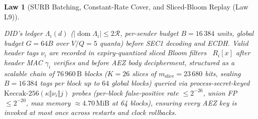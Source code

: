 \documentclass[journal]{IEEEtran}
\newtheorem{law}{Law}
\begin{document}
\begin{law}[SURB Batching, Constant-Rate Cover, and Sliced-Bloom Replay (Law L9)]
\begin{enumerate}[leftmargin=1.5em]
DID's ledger $\Lambda_i(d)$ ($|\operatorname{dom}\Lambda_i|\le 2\mathcal{R}$,
per-sender budget $B=16\,384$ units, global budget $G=64B$ over $V/Q=5$ quanta)
\emph{before} SEC1 decoding and ECDH.  Valid header tags $\nu_i$ are recorded in
expiry-quantized sliced Bloom filters~\cite{Bloom1970,Almeida2007} $R_i[x]$ \emph{after} header MAC $\gamma_i$ verifies and \emph{before} AEZ body decipherment,
structured as a scalable chain of $76\,960\,\mathrm{B}$ blocks ($K=26$ slices of $m_{\mathrm{slice}}=23\,680$ bits, sealing $B=16\,384$ tags per block up to $64$ global blocks) queried via process-secret-keyed $\mathrm{Keccak\text{-}256}(\kappa\Vert\nu_i\Vert j)$ probes (per-block false-positive rate $\le 2^{-26}$,
union FP $\le 2^{-20}$, max memory $\approx 4.70\,\mathrm{MiB}$ at 64 blocks), ensuring every AEZ
key is invoked at most once across restarts and clock rollbacks.
\end{enumerate}
\end{law}
\end{document}
